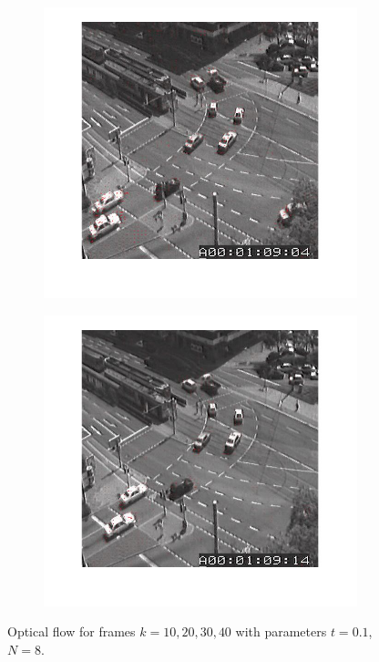 \documentclass[a4paper]{iacas}
\begin{document}
\begin{figure}[!htbp]
	\begin{subfigure}[b]{0.4\textwidth}
		\includegraphics[width=\textwidth]{409.jpg}
		\caption{}
		\label{fig:409}
	\end{subfigure}
	\begin{subfigure}[b]{0.4\textwidth}
		\includegraphics[width=\textwidth]{410.jpg}
		\caption{}
		\label{fig:410}
	\end{subfigure}
	
	\label{fig:400b}
	\caption{Optical flow for frames $k=10, 20, 30,40$ with parameters $t=0.1$, $N=8$.}
\end{figure}
\end{document}
